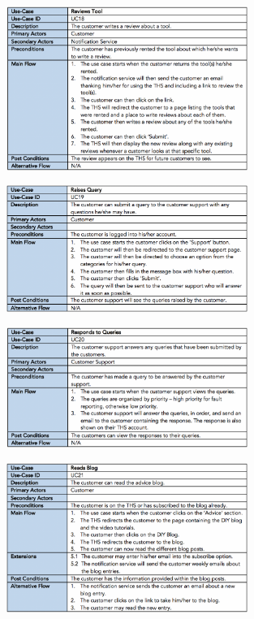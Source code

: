 \begin{figure}[H]
      \centering
      \includegraphics[trim = 0 0 0 0, clip, width=0.7\textwidth]{TempImg/UC18.png}
 \end{figure}

\begin{figure}[H]
      \centering
      \includegraphics[trim = 0 0 0 0, clip, width=0.7\textwidth]{TempImg/UC19.png}
 \end{figure}

\begin{figure}[H]
      \centering
      \includegraphics[trim = 0 0 0 0, clip, width=0.7\textwidth]{TempImg/UC20.png}
 \end{figure}

\begin{figure}[H]
      \centering
      \includegraphics[trim = 0 0 0 0, clip, width=0.7\textwidth]{TempImg/UC21.png}
 \end{figure}

